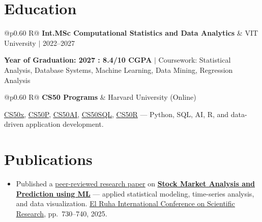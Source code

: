 \documentclass[a4paper,10pt]{article}
\newcommand{\ulink}[2]{\href{#1}{\uline{#2}}}
\newcommand{\subheading}[1]{{\color[HTML]{0A0A0A}\fontsize{12}{14}\selectfont\bfseries #1}}
\newcommand{\meta}[1]{{\color[HTML]{5C5C5C}\fontsize{10.5}{12.5}\selectfont #1}}
\begin{document}
\vspace{2pt}

\section{Education}
\vspace{2pt}

\begin{tabularx}{\linewidth}{@{}p{0.60\linewidth} R@{}}
\subheading{Int.MSc Computational Statistics and Data Analytics} & \meta{VIT University $|$ 2022--2027}
\end{tabularx}
\vspace{1pt}
{\color[HTML]{3A3A3A}\fontsize{11}{14}\selectfont \textbf{Year of Graduation: 2027 : 8.4/10 CGPA } $|$ Coursework: Statistical Analysis, Database Systems, Machine Learning, Data Mining, Regression Analysis}

\begin{tabularx}{\linewidth}{@{}p{0.60\linewidth} R@{}}
\subheading{CS50 Programs} & \meta{Harvard University (Online)}
\end{tabularx}
\vspace{1pt}
{\color[HTML]{3A3A3A}\fontsize{11}{14}\selectfont \ulink{https://cs50.harvard.edu/certificates/b14b78df-e05c-413e-a607-1dd27303053a}{CS50x}, \ulink{https://cs50.harvard.edu/certificates/32477052-9db4-49c4-a5a4-d7e58429ca2c}{CS50P}, \ulink{https://cs50.harvard.edu/certificates/9cdb4d4a-1250-4f8e-9fd7-191864e0f919}{CS50AI}, \ulink{https://cs50.harvard.edu/certificates/bc486f24-f085-4e61-8536-80940b97a1b9}{CS50SQL}, \ulink{https://cs50.harvard.edu/certificates/666838e6-a053-4d82-b179-a60fe745fd84}{CS50R} --- Python, SQL, AI, R, and data-driven application development.}

\vspace{2pt}

\section{Publications}
\vspace{2pt}
\begin{itemize}[nosep, leftmargin=1.5em, itemsep=1pt, topsep=2pt]
  \item {\color[HTML]{0A0A0A}\fontsize{11}{14}\selectfont
  Published a \ulink{https://www.elruha.org/_files/ugd/614b1f_6b95e1b697bf452b9907ba46e0151c05.pdf\#page=774}{peer-reviewed research paper} on \ulink{https://github.com/su-jin1425/Set-Project}{\textbf{Stock Market Analysis and Prediction using ML}} --- applied statistical modeling, time-series analysis, and data visualization. \ulink{https://www.elruha.org/congress-books}{El Ruha International Conference on Scientific Research}, pp.\ 730--740, 2025.}
\end{itemize}
\end{document}
